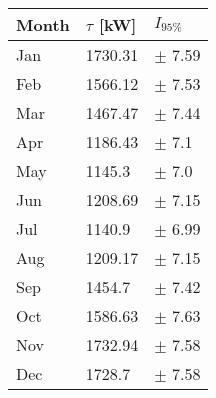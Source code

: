 \begin{tabular}{lll}
\toprule
Month & $\tau$ [kW] &   $I_{95\%}$ \\
\midrule
  Jan &     1730.31 &   $\pm$ 7.59 \\
  Feb &     1566.12 &   $\pm$ 7.53 \\
  Mar &     1467.47 &   $\pm$ 7.44 \\
  Apr &     1186.43 &    $\pm$ 7.1 \\
  May &      1145.3 &    $\pm$ 7.0 \\
  Jun &     1208.69 &   $\pm$ 7.15 \\
  Jul &      1140.9 &   $\pm$ 6.99 \\
  Aug &     1209.17 &   $\pm$ 7.15 \\
  Sep &      1454.7 &   $\pm$ 7.42 \\
  Oct &     1586.63 &   $\pm$ 7.63 \\
  Nov &     1732.94 &   $\pm$ 7.58 \\
  Dec &      1728.7 &   $\pm$ 7.58 \\
\bottomrule
\end{tabular}
